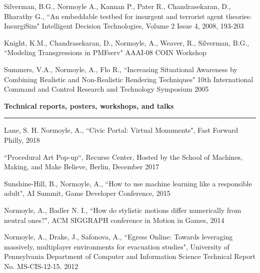 Silverman, B.G., Normoyle A., Kannan P., Pater R., Chandrasekaran, D., Bharathy G., ``An embeddable testbed for insurgent and terrorist agent theories: InsurgiSim" Intelligent Decision Technologies, Volume 2 Issue 4, 2008, 193-203

Knight, K.M., Chandrasekaran, D., Normoyle, A., Weaver, R., Silverman, B.G., ``Modeling Transgressions in PMFserv" AAAI-08 COIN Workshop

Summers, V.A., Normoyle, A., Flo R., ``Increasing Situational Awareness by Combining Realistic and Non-Realistic Rendering Techniques" 10th International Command and Control Research and Technology Symposium 2005

\medskip
\medskip

{\Large {\bf  Technical reports, posters, workshops, and talks}}
\vspace{0.1cm}
\hrule
\medskip

Lane, S. H. Normoyle, A., ``Civic Portal: Virtual Monuments", Fast Forward Philly, 2018

``Procedural Art Pop-up``, Recurse Center, Hosted by the School of Machines, Making, and Make Believe, Berlin, December 2017 

Sunshine-Hill, B., Normoyle, A., ``How to use machine learning like a responsible adult", AI Summit, Game Developer Conference, 2015

Normoyle, A., Badler N. I., ``How do stylistic motions differ numerically from neutral ones?", ACM SIGGRAPH conference in Motion in Games, 2014

Normoyle, A., Drake, J., Safonova, A., ``Egress Online: Towards leveraging massively, multiplayer environments for evacuation studies", University of Pennsylvania Department of Computer and Information Science Technical Report No. MS-CIS-12-15. 2012

\medskip
\medskip


